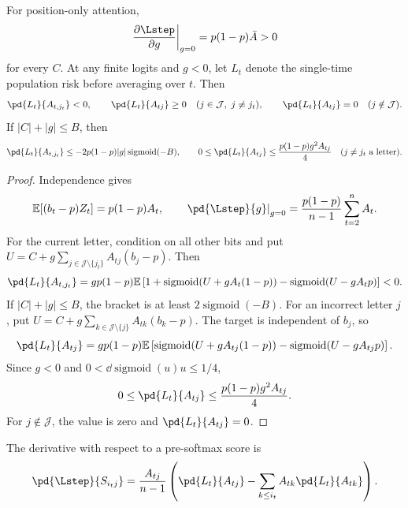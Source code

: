 \begin{lemma}
\label{lem:lr-signs}
For position-only attention,
\begin{equation}\label{eq:lr-initial-gate-gradient}
 \left.\frac{\partial\Lstep}{\partial g}\right|_{g=0}
 =p(1-p)\bar A>0
\end{equation}
for every $C$. At any finite logits and $g<0$, let $L_t$ denote the single-time population risk before averaging over $t$. Then
\begin{equation}\label{eq:lr-feature-source-signs}
 \pd{L_t}{A_{t,j_t}}<0,\qquad \pd{L_t}{A_{tj}}\ge0
 \quad(j\in\mathcal J,\;j\ne j_t),\qquad
 \pd{L_t}{A_{tj}}=0\quad(j\notin\mathcal J).
\end{equation}
If $|C|+|g|\le B$, then
\begin{equation}\label{eq:lr-source-bounds}
 \pd{L_t}{A_{t,j_t}}\le-2p(1-p)|g|\operatorname{sigmoid}(-B),\qquad
 0\le \pd{L_t}{A_{tj}}\le\frac{p(1-p) g^2A_{tj}}4\quad(j\ne j_t\text{ a letter}).
\end{equation}
\end{lemma}
\begin{proof}
Independence gives
\[
 \mathbb E[(b_t-p)Z_t]=p(1-p)A_t,\qquad
 \left.\pd{\Lstep}{g}\right|_{g=0}
 =\frac{p(1-p)}{n-1}\sum_{t=2}^n A_t.
\]
For the current letter, condition on all other bits and put
$U=C+g\sum_{j\in\mathcal J\setminus\{j_t\}}A_{tj}(b_j-p)$. Then
\[
 \pd{L_t}{A_{t,j_t}}=gp(1-p)\mathbb E
 \left[1+\operatorname{sigmoid}(U+gA_t(1-p))-\operatorname{sigmoid}(U-gA_tp)\right]<0.
\]
If $|C|+|g|\le B$, the bracket is at least $2\operatorname{sigmoid}(-B)$.
For an incorrect letter $j$, put
$U=C+g\sum_{k\in\mathcal J\setminus\{j\}}A_{tk}(b_k-p)$.
The target is independent of $b_j$, so
\[
 \pd{L_t}{A_{tj}}=gp(1-p)\mathbb E
 \left[\operatorname{sigmoid}(U+gA_{tj}(1-p))-\operatorname{sigmoid}(U-gA_{tj}p)\right].
\]
Since $g<0$ and $0<\dd{\operatorname{sigmoid}(u)}{u}\le1/4$,
\[
 0\le\pd{L_t}{A_{tj}}\le\frac{p(1-p)g^2A_{tj}}4.
\]
For $j\notin\mathcal J$, the value is zero and $\pd{L_t}{A_{tj}}=0$.
\end{proof}

The derivative with respect to a pre-softmax score is
\begin{equation}
 \pd{\Lstep}{S_{i_tj}}=\frac{A_{tj}}{n-1}
 \left(\pd{L_t}{A_{tj}}-\sum_{k\le i_t}A_{tk}\pd{L_t}{A_{tk}}\right).
\end{equation}

